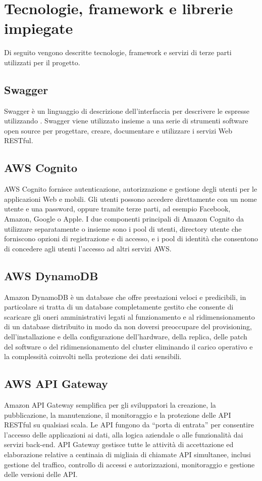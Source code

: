 \section{Tecnologie, framework e librerie impiegate}\label{Tecnologie}
Di seguito vengono descritte tecnologie, framework e servizi di terze parti utilizzati per il progetto.
\subsection{Swagger}
Swagger è un linguaggio di descrizione dell'interfaccia per descrivere le   espresse utilizzando . Swagger viene utilizzato insieme a una serie di strumenti software open source per progettare, creare, documentare e utilizzare i servizi Web RESTful.
\subsection{AWS Cognito}
AWS Cognito fornisce autenticazione, autorizzazione e gestione degli utenti per le applicazioni Web e mobili. Gli utenti possono accedere direttamente con un nome utente e una password, oppure tramite terze parti, ad esempio Facebook, Amazon, Google o Apple.
I due componenti principali di Amazon Cognito da utilizzare separatamente o insieme sono i pool di utenti, directory utente che forniscono opzioni di registrazione e di accesso, e i pool di identità che consentono di concedere agli utenti l'accesso ad altri servizi AWS.
\subsection{AWS DynamoDB} 
Amazon DynamoDB è un database  che offre prestazioni veloci e predicibili, in particolare si tratta di un database completamente gestito che consente di scaricare gli oneri amministrativi legati al funzionamento e al ridimensionamento di un database distribuito in modo da non doversi preoccupare del provisioning, dell'installazione e della configurazione dell'hardware, della replica, delle patch del software o del ridimensionamento del cluster eliminando il carico operativo e la complessità coinvolti nella protezione dei dati sensibili. 

\subsection{AWS API Gateway}
Amazon API Gateway semplifica per gli sviluppatori la creazione, la pubblicazione, la manutenzione, il monitoraggio e la protezione delle API RESTful su qualsiasi scala. Le API fungono da “porta di entrata” per consentire l’accesso delle applicazioni ai dati, alla logica aziendale o alle funzionalità dai servizi back-end. 
API Gateway gestisce tutte le attività di accettazione ed elaborazione relative a centinaia di migliaia di chiamate API simultanee, inclusi gestione del traffico, controllo di accessi e autorizzazioni, monitoraggio e gestione delle versioni delle API. 

